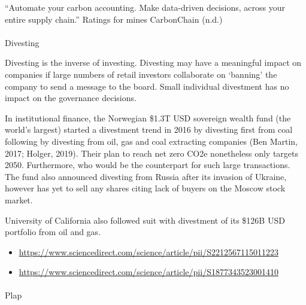 \documentclass[
  letterpaper,
  DIV=11,
  numbers=noendperiod]{scrartcl}
\makeatletter
\let\oldparagraph\paragraph
\renewcommand{\paragraph}{
    \@ifstar
      \xxxParagraphStar
      \xxxParagraphNoStar
  }
\newcommand{\xxxParagraphStar}[1]{\oldparagraph*{#1}\mbox{}}
\newcommand{\xxxParagraphNoStar}[1]{\oldparagraph{#1}\mbox{}}
\makeatother
\begin{document}
``Automate your carbon accounting. Make data-driven decisions, across
your entire supply chain.'' Ratings for mines CarbonChain (n.d.)

\paragraph{Divesting}\label{divesting}

Divesting is the inverse of investing. Divesting may have a meaningful
impact on companies if large numbers of retail investors collaborate on
`banning' the company to send a message to the board. Small individual
divestment has no impact on the governance decisions.

In institutional finance, the Norwegian \$1.3T USD sovereign wealth fund
(the world's largest) started a divestment trend in 2016 by divesting
first from coal following by divesting from oil, gas and coal extracting
companies (Ben Martin, 2017; Holger, 2019). Their plan to reach net zero
CO2e nonetheless only targets 2050. Furthermore, who would be the
counterpart for such large transactions. The fund also announced
divesting from Russia after its invasion of Ukraine, however has yet to
sell any shares citing lack of buyers on the Moscow stock market.

University of California also followed suit with divestment of its
\$126B USD portfolio from oil and gas.

\begin{itemize}
\item
  \url{https://www.sciencedirect.com/science/article/pii/S2212567115011223}
\item
  \url{https://www.sciencedirect.com/science/article/pii/S1877343523001410}
\end{itemize}

\paragraph{Plap}\label{plap}
\end{document}
